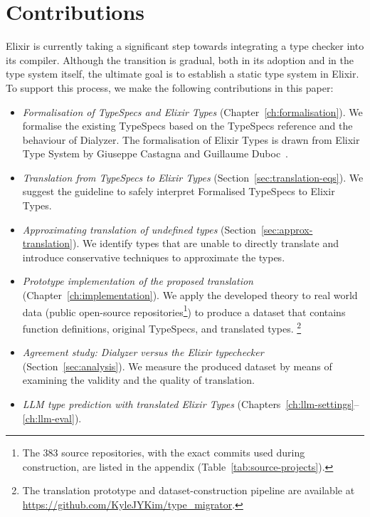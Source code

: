\section{Contributions}

Elixir is currently taking a significant step towards integrating a type checker into its compiler.
Although the transition is gradual, both in its adoption and in the type system itself, the ultimate goal is to establish a static type system in Elixir.
To support this process, we make the following contributions in this paper:

\begin{itemize}
    \item \textit{Formalisation of TypeSpecs and Elixir Types} (Chapter~\ref{ch:formalisation}).
    We formalise the existing TypeSpecs based on the TypeSpecs reference and the behaviour of Dialyzer. 
    The formalisation of Elixir Types is drawn from Elixir Type System by Giuseppe Castagna and Guillaume Duboc~\cite{duboc2024}.
    \item \textit{Translation from TypeSpecs to Elixir Types} (Section~\ref{sec:translation-eqs}).
    We suggest the guideline to safely interpret Formalised TypeSpecs to Elixir Types.
    \item \textit{Approximating translation of undefined types} (Section~\ref{sec:approx-translation}).
    We identify types that are unable to directly translate and introduce conservative techniques to approximate the types.
    \item \textit{Prototype implementation of the proposed translation} (Chapter~\ref{ch:implementation}).
    We apply the developed theory to real world data (public open-source repositories\footnote{The \num{383} source repositories, with the exact commits used during construction, are listed in the appendix (Table~\ref{tab:source-projects}).}) to produce a dataset that contains function definitions, original TypeSpecs, and translated types.
    \footnote{The translation prototype and dataset-construction pipeline are available at \url{https://github.com/KyleJYKim/type_migrator}.}
    \item \textit{Agreement study: Dialyzer versus the Elixir typechecker} (Section~\ref{sec:analysis}).
    We measure the produced dataset by means of examining the validity and the quality of translation.
    \item \textit{LLM type prediction with translated Elixir Types} (Chapters~\ref{ch:llm-settings}--\ref{ch:llm-eval}).

\end{itemize}

